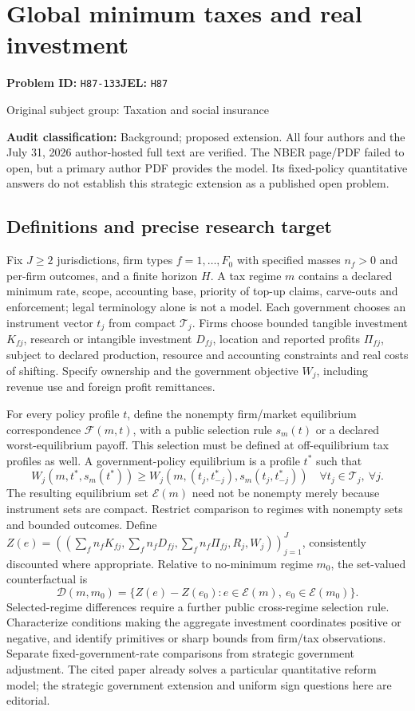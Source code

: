 \documentclass[11pt,a4paper]{article}
\begin{document}
\section*{Global minimum taxes and real investment}
\textbf{Problem ID:} \texttt{H87-133}\quad \textbf{JEL:} \texttt{H87}\par
\label{problem:OP-0475}
{\sffamily\small\color{muted}Original subject group: Taxation and social insurance\par}
\label{definitions:problem:30007757}
\textbf{Audit classification:} Background; proposed extension. All four authors and the July 31, 2026 author-hosted full text are verified. The NBER page/PDF failed to open, but a primary author PDF provides the model. Its fixed-policy quantitative answers do not establish this strategic extension as a published open problem.
\subsection*{Definitions and precise research target}
Fix \(J\geq2\) jurisdictions, firm types \(f=1,\ldots,F_0\) with specified masses \(n_f>0\) and per-firm outcomes, and a finite horizon \(H\). A tax regime \(m\) contains a declared minimum rate, scope, accounting base, priority of top-up claims, carve-outs and enforcement; legal terminology alone is not a model. Each government chooses an instrument vector \(t_j\) from compact \(\mathcal T_j\). Firms choose bounded tangible investment \(K_{fj}\), research or intangible investment \(D_{fj}\), location and reported profits \(\Pi_{fj}\), subject to declared production, resource and accounting constraints and real costs of shifting. Specify ownership and the government objective \(W_j\), including revenue use and foreign profit remittances.

For every policy profile \(t\), define the nonempty firm/market equilibrium correspondence \(\mathcal F(m,t)\), with a public selection rule \(s_m(t)\) or a declared worst-equilibrium payoff. This selection must be defined at off-equilibrium tax profiles as well. A government-policy equilibrium is a profile \(t^*\) such that
\[
 W_j(m,t^*,s_m(t^*))\geq
 W_j(m,(t_j,t^*_{-j}),s_m(t_j,t^*_{-j}))
 \quad\forall t_j\in\mathcal T_j,\ \forall j.
\]
The resulting equilibrium set \(\mathcal E(m)\) need not be nonempty merely because instrument sets are compact. Restrict comparison to regimes with nonempty sets and bounded outcomes. Define \(Z(e)=((\sum_fn_fK_{fj},\sum_fn_fD_{fj},\sum_fn_f\Pi_{fj},R_j,W_j))_{j=1}^J\), consistently discounted where appropriate. Relative to no-minimum regime \(m_0\), the set-valued counterfactual is
\[
 \mathcal D(m,m_0)=\{Z(e)-Z(e_0):e\in\mathcal E(m),\ e_0\in\mathcal E(m_0)\}.
\]
Selected-regime differences require a further public cross-regime selection rule. Characterize conditions making the aggregate investment coordinates positive or negative, and identify primitives or sharp bounds from firm/tax observations. Separate fixed-government-rate comparisons from strategic government adjustment. The cited paper already solves a particular quantitative reform model; the strategic government extension and uniform sign questions here are editorial.
\end{document}
